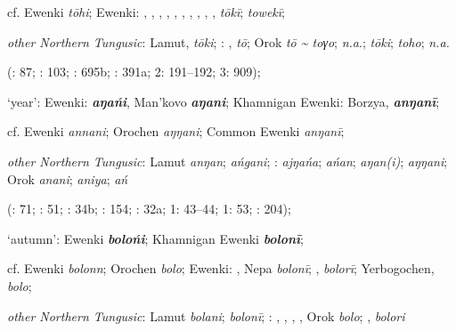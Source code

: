 \documentclass[output=paper,colorlinks,citecolor=brown]{langscibook}
\begin{document}
\begin{xlist}
    cf.  Ewenki \textit{tōhi};  Ewenki: , , , , , , , , , ,  \textit{tōkī};  \textit{towekī};

    \textit{other Northern Tungusic}: Lamut,  \textit{tōki}; \textit{}: ,  \textit{tō}; Orok \textit{tō {\textasciitilde} toγo};  \textit{n.a}.;  \textit{tōki};  \textit{toho};  \textit{n.a.}
    
    (\citealt{Castrén1856}: 87; \citealt{Janhunen1991}: 103; \citealt{Dorji1998}: 695b; \citealt{Vasilevic1958}: 391a; \citealt{Cincius1975B} 2: 191--192; \citealt{Hauer1952} 3: 909);

    \ex  ‘year’:  Ewenki:  \textbf{\textit{aŋańi}}, Man’kovo \textbf{\textit{aŋani}}; Khamnigan Ewenki: Borzya,  \textbf{\textit{anŋanī}};

    cf.  Ewenki \textit{annani}; Orochen \textit{aŋŋani};  Common Ewenki \textit{anŋanī};

    \textit{other Northern Tungusic}: Lamut \textit{anŋan};  \textit{ańgani}; \textit{}:  \textit{ajŋańa};  \textit{ańan};  \textit{aŋan(i)};  \textit{aŋŋani}; Orok \textit{anani};  \textit{aniya};  \textit{ań} 
    
    (\citealt{Castrén1856}: 71; \citealt{Janhunen1991}: 51; \citealt{Dorji1998}: 34b; \citealt{Chaoke2014a}: 154; \citealt{Vasilevic1958}: 32a; \citealt{Cincius1975B} 1: 43--44; \citealt{Hauer1952} 1: 53; \citealt{Zikmundová2013a}: 204); 

    \ex  ‘autumn’:  Ewenki \textbf{\textit{bolońi}}; Khamnigan Ewenki \textbf{\textit{bolonī}};

    cf.  Ewenki \textit{bolonn}; Orochen \textit{bolo};  Ewenki: , Nepa \textit{bolonī}; ,  \textit{bolorī}; Yerbogochen,  \textit{bolo};

    \textit{other Northern Tungusic}: Lamut \textit{bolani};  \textit{bolonī}; \textit{}: , , , , Orok \textit{bolo}; ,  \textit{bolori} 
    

\end{xlist}
\end{document}
